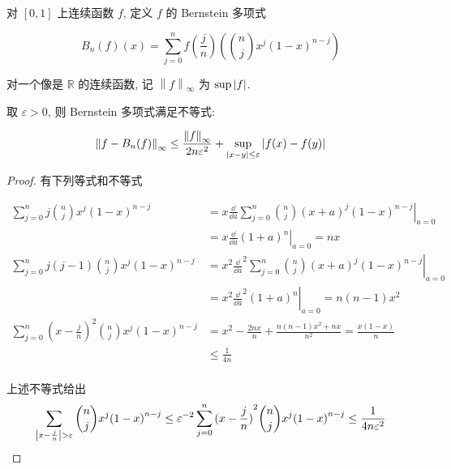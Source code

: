 \begin{definition}
    \label {definition:Bernstein polynomials}
    对 \([0,1]\)  上连续函数 \(f\), 定义 \(f\) 的 Bernstein 多项式 
    
    \[
        B_n (f) (x) = \sum_{j = 0}^{n} f (\frac{j}{n}) (\binom{n}{j} x^j {(1-x)}^{n-j})
    \]
\end{definition}

\begin{remark}
    对一个像是 \(\mathbb{R}\) 的连续函数, 记 \(\left\| f \right\|_{\infty}\) 为 \(\sup \abs {f}\).
\end{remark}

\begin{theorem}
    \label {theorem:Bernstein approximation theorem}
    取 \(\varepsilon > 0\), 则 Bernstein 多项式满足不等式:

    \[
        \left\| f - B_n(f) \right\|_\infty \leq \frac{\left\| f \right\|_\infty}{2 n \varepsilon^2} + \sup_{\left|x-y\right| \leq \varepsilon} \abs {f(x) - f(y)}
    \]

    \begin{proof}
        有下列等式和不等式

        \[
            \begin{aligned}
                \sum_{j = 0}^n j \binom{n}{j} x^j {(1-x)}^{n-j} &= \left. x \frac{\dd}{\dd a} \sum_{j = 0}^n \binom{n}{j} {(x+a)}^j {(1-x)}^{n-j} \right|_{a=0} \\
                &= \left. x \frac{\dd}{\dd a} {(1+a)}^n \right|_{a = 0} = nx \\
                \sum_{j = 0}^n j(j-1) \binom{n}{j} x^j {(1-x)}^{n-j} &= \left. x^2 {\frac{\dd}{\dd a}}^2 \sum_{j = 0}^n \binom{n}{j} {(x+a)}^j {(1-x)}^{n-j} \right|_{a=0} \\
                &= \left. x^2 {\frac{\dd}{\dd a}}^2 {(1+a)}^n \right|_{a = 0} = n(n-1)x^2 \\
                \sum_{j = 0}^n {(x - \frac{j}{n})}^2 \binom{n}{j} x^j {(1-x)}^{n-j} 
                &= x^2 - \frac{2nx}{n} + \frac{n(n-1)x^2 + nx}{n^2} = \frac{x(1-x)}{n} \\
                &\leq \frac{1}{4n} \\ 
            \end{aligned}
        \]

        上述不等式给出 
        \[
            \sum_{\abs{x - \frac{j}{n}} > \varepsilon} \binom{n}{j} x^j {(1-x)}^{n-j} \leq \varepsilon^{-2} \sum_{j = 0}^n {(x - \frac{j}{n})}^2 \binom{n}{j} x^j {(1-x)}^{n-j} \leq \frac{1}{4n\varepsilon^2}
        \]


\end{proof}
\end{theorem}
